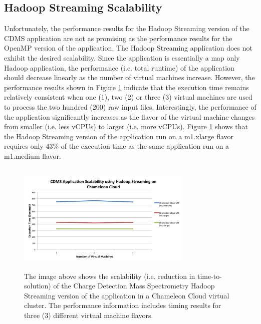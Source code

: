 \documentclass[9pt,twocolumn,twoside]{../../styles/osajnl}
\begin{document}
\subsection{Hadoop Streaming Scalability} \label{hadoop-scalability}
Unfortunately, the performance results for the Hadoop Streaming
version of the CDMS application are not as promising as the
performance results for the OpenMP version of the application. The
Hadoop Streaming application does not exhibit the desired
scalability. Since the application is essentially a map only Hadoop
application, the performance (i.e. total runtime) of the application
should decrease linearly as the number of virtual machines
increase. However, the performance results shown in Figure
\ref{fig:hadoop-benchmark} indicate that the execution time remains
relatively consistent when one (1), two (2) or three (3) virtual
machines are used to process the two hundred (200) raw input
files. Interestingly, the performance of the application significantly
increases as the flavor of the virtual machine changes from smaller
(i.e. less vCPUs) to larger (i.e. more vCPUs). Figure
\ref{fig:hadoop-benchmark} shows that the Hadoop Streaming version of
the application run on a m1.xlarge flavor requires only 43\% of the
execution time as the same application run on a m1.medium flavor.

\begin{figure}[h]
\centering
\includegraphics[height=2.1in, width=3.3in]{images/hadoop_benchmark}
\caption{The image above shows the scalability (i.e. reduction in
  time-to-solution) of the Charge Detection Mass Spectrometry Hadoop
  Streaming version of the application in a Chameleon Cloud virtual
  cluster. The performance information includes timing results for
  three (3) different virtual machine flavors.}
\label{fig:hadoop-benchmark}
\end{figure}
\end{document}
